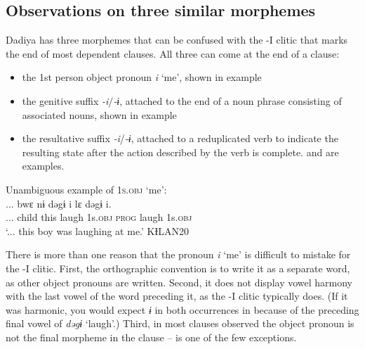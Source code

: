 \documentclass[output=paper]{langscibook}
\begin{document}
\subsection{Observations on three similar morphemes}\largerpage

Dadiya has three morphemes that can be confused with the -I clitic that marks the end of most dependent clauses. All three can come at the end of a clause:

\begin{itemize}
    \item the 1st person object pronoun \textit{i} `me', shown in example 
    \item the genitive suffix \textit{-i}/\textit{-ɨ}, attached to the end of a noun phrase consisting of associated nouns, shown in example 
    \item the resultative suffix \textit{-i}/\textit{-ɨ}, attached to a reduplicated verb to indicate the resulting state after the action described by the verb is complete.  and  are examples.
\end{itemize}

\ea Unambiguous example of \textsc{1s.obj} `me':
\label{ex:dettweiler:KƗLAN20} \\
\gll ... bwɛ nɨ dəgɨ i lɛ dəgɨ i. \\
... child this laugh 1s.\textsc{obj} \textsc{prog} laugh 1s.\textsc{obj} \\
\glt `... this boy was laughing at me.' KƗLAN20
\z

\noindent There is more than one reason that the pronoun \textit{i} `me' is difficult to mistake for the -I clitic. First, the orthographic convention is to write it as a separate word, as other object pronouns are written. Second, it does not display vowel harmony with the last vowel of the word preceding it, as the -I clitic typically does. (If it was harmonic, you would expect \textit{ɨ} in both occurrences in  because of the preceding final vowel of \textit{dəgɨ} `laugh'.) Third, in most clauses observed the object pronoun is not the final morpheme in the clause --  is one of the few exceptions.
\end{document}
